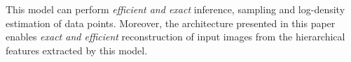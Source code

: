 \documentclass{article}
\begin{document}
This model can perform {\em efficient and exact} inference, sampling and log-density estimation of data points. Moreover, the architecture presented in this paper enables {\em exact and efficient} reconstruction of input images from the hierarchical features extracted by this model.
%


\end{document}
